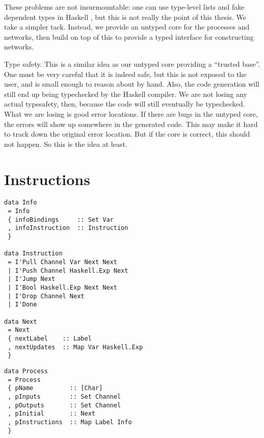 These problems are not insurmountable: one can use type-level lists and fake dependent types in Haskell \CITE, but this is not really the point of this thesis.
We take a simpler tack.
Instead, we provide an untyped core for the processes and networks, then build on top of this to provide a typed interface for constructing networks.

Type safety.
This is a similar idea as our untyped core providing a ``trusted base''.
One must be very careful that it is indeed safe, but this is not exposed to the user, and is small enough to reason about by hand.
Also, the code generation will still end up being typechecked by the Haskell compiler.
We are not losing any actual typesafety, then, because the code will still eventually be typechecked.
What we are losing is good error locations. If there are bugs in the untyped core, the errors will show up somewhere in the generated code.
This may make it hard to track down the original error location.
But if the core is correct, this should not happen.
So this is the idea at least.

\section{Instructions}

\begin{lstlisting}
data Info
 = Info
 { infoBindings     :: Set Var
 , infoInstruction  :: Instruction
 }

data Instruction
 = I'Pull Channel Var Next Next
 | I'Push Channel Haskell.Exp Next
 | I'Jump Next
 | I'Bool Haskell.Exp Next Next
 | I'Drop Channel Next
 | I'Done

data Next
 = Next
 { nextLabel    :: Label
 , nextUpdates  :: Map Var Haskell.Exp
 }
\end{lstlisting}

\begin{lstlisting}
data Process
 = Process
 { pName          :: [Char]
 , pInputs        :: Set Channel
 , pOutputs       :: Set Channel
 , pInitial       :: Next
 , pInstructions  :: Map Label Info
 }
\end{lstlisting}

